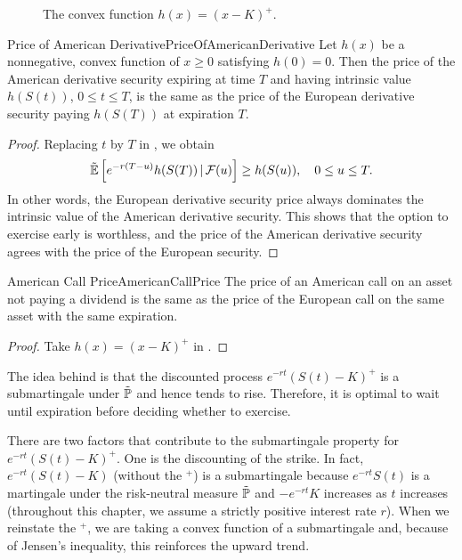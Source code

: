 \begin{figure}[H]
	\centering
	
	\caption{The convex function \(h(x) = (x-K)^+\).}
	\label{fig:ConvexFunctionPayoff}
\end{figure}

\begin{thm}{Price of American Derivative}{PriceOfAmericanDerivative}
	Let $h(x)$ be a nonnegative, convex function of $x \ge 0$ satisfying $h(0) = 0$. Then the price of the American derivative security expiring at time $T$ and having intrinsic value $h(S(t))$, $0 \le t \le T$, is the same as the price of the European derivative security paying $h(S(T))$ at expiration $T$.
\end{thm}

\begin{proof}
	Replacing $t$ by $T$ in , we obtain
	\[
		\tilde{\mathbb{E}}\left[e^{-r(T-u)}h(S(T)) \,\vert\, \mathcal{F}(u)\right] \ge h(S(u)), \quad 0 \le u \le T.
	\]
	In other words, the European derivative security price always dominates the intrinsic value of the American derivative security. This shows that the option to exercise early is worthless, and the price of the American derivative security agrees with the price of the European security.
\end{proof}

\begin{cor}{American Call Price}{AmericanCallPrice}
	The price of an American call on an asset not paying a dividend is the same as the price of the European call on the same asset with the same expiration.
\end{cor}

\begin{proof}
	Take $h(x) = (x - K)^+$ in .
\end{proof}

The idea behind  is that the discounted process $e^{-rt}(S(t) - K)^+$ is a submartingale under $\tilde{\mathbb{P}}$ and hence tends to rise. Therefore, it is optimal to wait until expiration before deciding whether to exercise.

There are two factors that contribute to the submartingale property for $e^{-rt}(S(t)-K)^+$. One is the discounting of the strike. In fact, $e^{-rt}(S(t)-K)$ (without the $^+$) is a submartingale because $e^{-rt}S(t)$ is a martingale under the risk-neutral measure $\tilde{\mathbb{P}}$ and $-e^{-rt}K$ increases as $t$ increases (throughout this chapter, we assume a strictly positive interest rate $r$). When we reinstate the $^+$, we are taking a convex function of a submartingale and, because of Jensen's inequality, this reinforces the upward trend.

